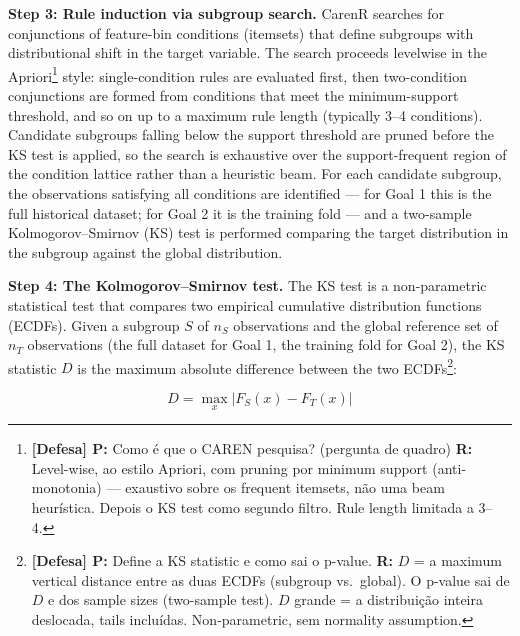 \textbf{Step 3: Rule induction via subgroup search. }CarenR searches for conjunctions of feature-bin conditions (itemsets) that define subgroups with distributional shift in the target variable. The search proceeds levelwise in the Apriori\footnote{\textbf{[Defesa] P:} Como é que o CAREN pesquisa? (pergunta de quadro) \textbf{R:} Level-wise, ao estilo Apriori, com pruning por minimum support (anti-monotonia) --- exaustivo sobre os frequent itemsets, não uma beam heurística. Depois o KS test como segundo filtro. Rule length limitada a 3--4.} style: single-condition rules are evaluated first, then two-condition conjunctions are formed from conditions that meet the minimum-support threshold, and so on up to a maximum rule length (typically 3--4 conditions). Candidate subgroups falling below the support threshold are pruned before the KS test is applied, so the search is exhaustive over the support-frequent region of the condition lattice rather than a heuristic beam. For each candidate subgroup, the observations satisfying all conditions are identified --- for Goal 1 this is the full historical dataset; for Goal 2 it is the training fold --- and a two-sample Kolmogorov--Smirnov (KS) test is performed comparing the target distribution in the subgroup against the global distribution.

\textbf{Step 4: The Kolmogorov--Smirnov test. }The KS test is a non-parametric statistical test that compares two empirical cumulative distribution functions (ECDFs). Given a subgroup $S$ of $n_S$ observations and the global reference set of $n_T$ observations (the full dataset for Goal 1, the training fold for Goal 2), the KS statistic $D$ is the maximum absolute difference between the two ECDFs\footnote{\textbf{[Defesa] P:} Define a KS statistic e como sai o p-value. \textbf{R:} $D$ = a maximum vertical distance entre as duas ECDFs (subgroup vs.\ global). O p-value sai de $D$ e dos sample sizes (two-sample test). $D$ grande = a distribuição inteira deslocada, tails incluídas. Non-parametric, sem normality assumption.}:

\begin{equation}
  D = \max_{x} \left| F_S(x) - F_T(x) \right|
  \label{eq:ks}
\end{equation}

